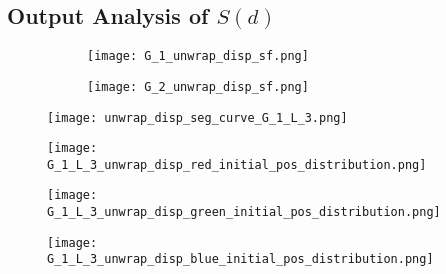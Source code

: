 


\subsection{Output Analysis of $S(d)$}



      \begin{figure}
        \centering
        
        \begin{subfigure}[b]{0.45\textwidth}
          \texttt{[image: G\_1\_unwrap\_disp\_sf.png]}
          \caption{}
          \label{fig:sf_g1_branch_disp}
        \end{subfigure}
        \hfill
        \begin{subfigure}[b]{0.45\textwidth}
          \texttt{[image: G\_2\_unwrap\_disp\_sf.png]}
          \caption{}
          \label{fig:sf_g2_branch_disp}
        \end{subfigure}

        \caption{}
        \label{fig:sf_branch_disp}

      \end{figure}




      \begin{figure}
         \centering
         \texttt{[image: unwrap\_disp\_seg\_curve\_G\_1\_L\_3.png]}
         \caption{}
         \label{fig:disp_seg_curve_G_1_L_3}
      \end{figure}

      
       \begin{figure}
         \centering
         \texttt{[image: G\_1\_L\_3\_unwrap\_disp\_red\_initial\_pos\_distribution.png]}
         \caption{}
         \label{fig:G_1_L_3_disp_red_initial_pos_distribution}
       \end{figure}


       \begin{figure}
         \centering
         \texttt{[image: G\_1\_L\_3\_unwrap\_disp\_green\_initial\_pos\_distribution.png]}
         \caption{}
         \label{fig:G_1_L_3_disp_green_initial_pos_distribution}
       \end{figure}


        \begin{figure}
         \centering
         \texttt{[image: G\_1\_L\_3\_unwrap\_disp\_blue\_initial\_pos\_distribution.png]}
         \caption{}
         \label{fig:G_1_L_3_disp_blue_initial_pos_distribution}
        \end{figure}


